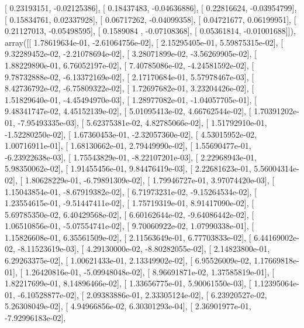 \documentclass{article}
\begin{document}
       [ 0.23193151, -0.02125386],
       [ 0.18437483, -0.04636886],
       [ 0.22816624, -0.03954799],
       [ 0.15834761,  0.02337928],
       [ 0.06717262, -0.04099358],
       [ 0.04721677,  0.06199951],
       [ 0.21127013, -0.05498595],
       [ 0.1589084 , -0.07108368],
       [ 0.05361814, -0.01001688]]), array([[  1.78619634e-01,  -2.61064756e-02],
       [  2.15295405e-01,   5.59875315e-02],
       [  9.32289452e-02,  -2.21078694e-02],
       [  3.28071899e-02,  -3.56269905e-02],
       [  1.88229890e-01,   6.76052197e-02],
       [  7.40785086e-02,  -4.24581592e-02],
       [  9.78732888e-02,  -6.13372169e-02],
       [  2.17170684e-01,   5.57978467e-03],
       [  8.42736792e-02,  -6.75809322e-02],
       [  1.72697682e-01,   3.23204426e-02],
       [  1.51829640e-01,  -4.45494970e-03],
       [  1.28977082e-01,  -1.04057705e-01],
       [  9.48341747e-02,   4.45152139e-02],
       [  5.01095413e-02,   4.66762544e-02],
       [  1.70391202e-01,  -7.95493335e-03],
       [  5.62375381e-02,   4.82785066e-02],
       [  1.51792910e-01,  -1.52280250e-02],
       [  1.67360453e-01,  -2.32057360e-02],
       [  4.53015952e-02,   1.00716911e-01],
       [  1.68130662e-01,   2.79449990e-02],
       [  1.55690477e-01,  -6.23922638e-03],
       [  1.75543829e-01,  -8.22107201e-03],
       [  2.22968943e-01,   5.98350062e-02],
       [  1.91455456e-01,   9.84476419e-03],
       [  2.22681623e-01,   5.56004314e-02],
       [  1.80628229e-01,  -6.79891309e-02],
       [  1.79946727e-01,   3.97074420e-03],
       [  1.15043854e-01,  -8.67919382e-02],
       [  6.71973231e-02,  -9.15264534e-02],
       [  1.23554615e-01,  -9.51447411e-02],
       [  1.75719319e-01,   8.91417090e-02],
       [  5.69785350e-02,   6.40429568e-02],
       [  6.60162644e-02,  -9.64086442e-02],
       [  1.06510856e-01,  -5.07554741e-02],
       [  9.70060922e-02,   1.07990338e-01],
       [  1.15826608e-01,   6.35561509e-02],
       [  2.11563649e-01,   6.77703833e-02],
       [  6.44169002e-02,  -8.11523619e-03],
       [  4.29130000e-02,  -8.80282055e-02],
       [  2.14823800e-01,   6.29263375e-02],
       [  1.00621433e-01,   2.13349902e-02],
       [  6.95526009e-02,   1.17669818e-01],
       [  1.26420816e-01,  -5.09948048e-02],
       [  8.96691871e-02,   1.37585819e-01],
       [  1.82217699e-01,   8.14896466e-02],
       [  1.33656775e-01,   5.90061550e-03],
       [  1.12395064e-01,  -6.10528877e-02],
       [  2.09383886e-01,   2.33305124e-02],
       [  6.23920527e-02,   5.26308049e-02],
       [  4.94966856e-02,   6.30301293e-04],
       [  2.36901977e-01,  -7.92996183e-02],
\end{document}
